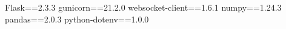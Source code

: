 Flask==2.3.3
gunicorn==21.2.0
websocket-client==1.6.1
numpy==1.24.3
pandas==2.0.3
python-dotenv==1.0.0
